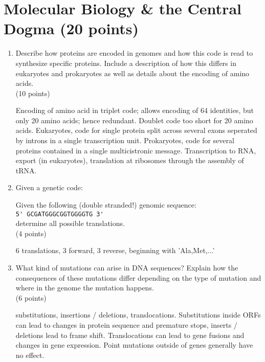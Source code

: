 \documentclass[11pt]{article}
\begin{document}
\section{Molecular Biology \& the Central Dogma (20 points)}
\begin{enumerate}
\item Describe how proteins are encoded in genomes and how this code is read
  to synthesize specific proteins. Include a description of
  how this differs in eukaryotes and prokaryotes as well as details about the
  encoding of amino acids.\\
  (10 points)
\begin{Notes}
  Encoding of amino acid in triplet code; allows encoding of 64 identities,
  but only 20 amino acids; hence redundant. Doublet code too short for 20
  amino acids. Eukaryotes, code for single protein split across several exons
  seperated by introns in a single transcription unit. Prokaryotes, code for
  several proteins contained in a single multicistronic message.
  Transcription to RNA, export (in eukaryotes), translation at ribosomes
  through the assembly of tRNA.
\end{Notes}

\item Given a genetic code:\\
  \begin{minipage}{0.6\textwidth}
  {\tiny
    
  }
  \end{minipage}

  Given the following (double stranded!) genomic sequence:\\
  \verb|5' GCGATGGGCGGTGGGGTG 3'|\\
  determine all possible translations.\\
  (4 points)

\begin{Notes}
  6 translations, 3 forward, 3 reverse, beginning with 'Ala,Met,...'
\end{Notes}

\item What kind of mutations can arise in DNA sequences? Explain how the
  consequences of these mutations differ depending on the type of mutation and
  where in the genome the mutation happens.\\
  (6 points)

\begin{Notes}
  substitutions, insertions / deletions, translocations. Substitutions inside ORFs
  can lead to changes in protein sequence and premature stops, inserts /
  deletions lead to frame shift. Translocations can lead to gene fusions
  and changes in gene expression. Point mutations outside of genes generally
  have no effect.
\end{Notes}


\end{enumerate}
\end{document}
